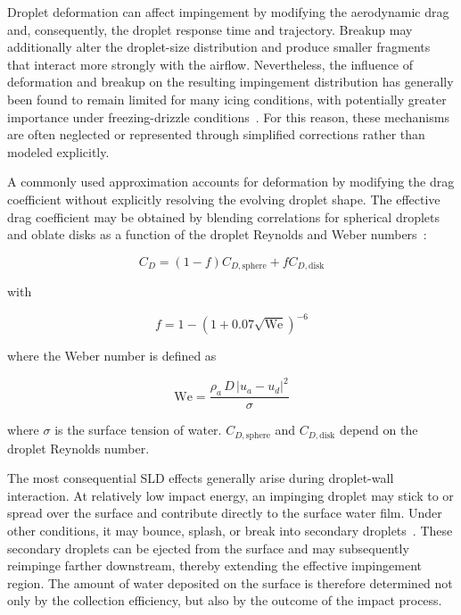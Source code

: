 Droplet deformation can affect impingement by modifying the aerodynamic drag and, consequently, the droplet response time and trajectory. Breakup may additionally alter the droplet-size distribution and produce smaller fragments that interact more strongly with the airflow. Nevertheless, the influence of deformation and breakup on the resulting impingement distribution has generally been found to remain limited for many icing conditions, with potentially greater importance under freezing-drizzle conditions~\cite{wright2004semi, trontin2016revisited}. For this reason, these mechanisms are often neglected or represented through simplified corrections rather than modeled explicitly.

A commonly used approximation accounts for deformation by modifying the drag coefficient without explicitly resolving the evolving droplet shape. The effective drag coefficient may be obtained by blending correlations for spherical droplets and oblate disks as a function of the droplet Reynolds and Weber numbers~\cite{clift2005bubbles}:

\begin{equation}
C_D
=
\left(1-f\right)C_{D,\mathrm{sphere}}
+
f C_{D,\mathrm{disk}}
\label{eq:CdBlend}
\end{equation}

with

\begin{equation}
f
=
1-
\left(
1+0.07\sqrt{\mathrm{We}}
\right)^{-6}
\label{eq:CdWeight}
\end{equation}

where the Weber number is defined as

\begin{equation}
\mathrm{We}
=
\frac{\rho_a \, D \, \vert u_a - u_d \vert^2}{\sigma}
\label{eq:Weber}
\end{equation}

where $\sigma$ is the surface tension of water. $C_{D,\mathrm{sphere}}$ and $C_{D,\mathrm{disk}}$ depend on the droplet Reynolds number.

The most consequential SLD effects generally arise during droplet-wall interaction. At relatively low impact energy, an impinging droplet may stick to or spread over the surface and contribute directly to the surface water film. Under other conditions, it may bounce, splash, or break into secondary droplets~\cite{tan2007experimental, andySLD}. These secondary droplets can be ejected from the surface and may subsequently reimpinge farther downstream, thereby extending the effective impingement region. The amount of water deposited on the surface is therefore determined not only by the collection efficiency, but also by the outcome of the impact process.

